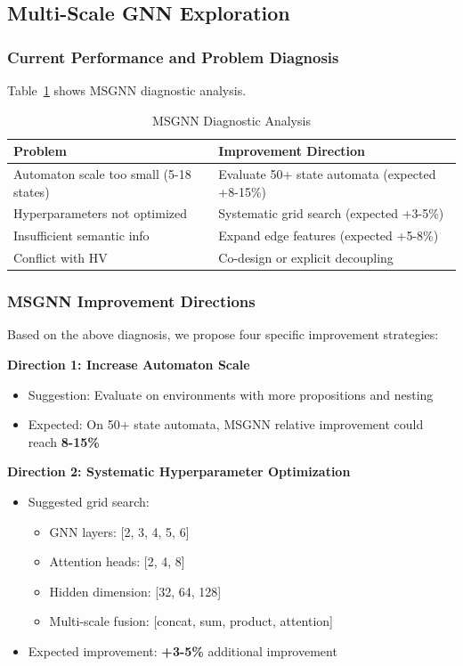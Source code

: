 \documentclass[conference]{IEEEtran}
\begin{document}
\subsection{Multi-Scale GNN Exploration}

\subsubsection{Current Performance and Problem Diagnosis}

Table~\ref{tab:msgnn_diagnosis} shows MSGNN diagnostic analysis.

\begin{table}[t]
\centering
\caption{MSGNN Diagnostic Analysis}
\label{tab:msgnn_diagnosis}
\begin{tabular}{@{}p{3cm}p{4.5cm}@{}}
\toprule
\textbf{Problem} & \textbf{Improvement Direction} \\ \midrule
Automaton scale too small (5-18 states) & Evaluate 50+ state automata (expected +8-15\%) \\
Hyperparameters not optimized & Systematic grid search (expected +3-5\%) \\
Insufficient semantic info & Expand edge features (expected +5-8\%) \\
Conflict with HV & Co-design or explicit decoupling \\ \bottomrule
\end{tabular}
\end{table}

\subsubsection{MSGNN Improvement Directions}

Based on the above diagnosis, we propose four specific improvement strategies:

\textbf{Direction 1: Increase Automaton Scale}
\begin{itemize}
    \item Suggestion: Evaluate on environments with more propositions and nesting
    \item Expected: On 50+ state automata, MSGNN relative improvement could reach \textbf{8-15\%}
\end{itemize}

\textbf{Direction 2: Systematic Hyperparameter Optimization}
\begin{itemize}
    \item Suggested grid search:
    \begin{itemize}
        \item GNN layers: [2, 3, 4, 5, 6]
        \item Attention heads: [2, 4, 8]
        \item Hidden dimension: [32, 64, 128]
        \item Multi-scale fusion: [concat, sum, product, attention]
    \end{itemize}
    \item Expected improvement: \textbf{+3-5\%} additional improvement
\end{itemize}
\end{document}
